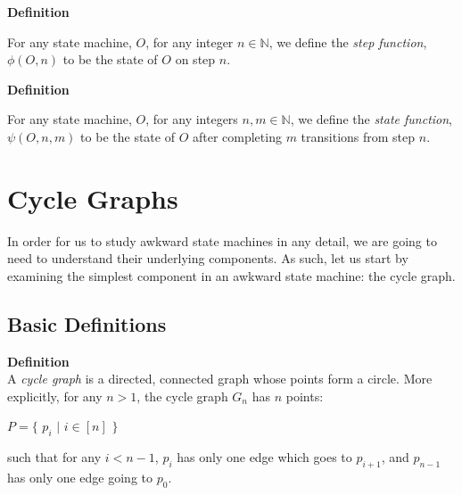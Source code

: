 \documentclass[a4paper,12pt]{article}
\begin{document}
\label{definition:state_machine}
\hypertarget{definition:state_machine}{}
\begin{tcolorbox}
\textbf{Definition}

\noindent For any state machine, $O$, for any integer $n \in \mathbb{N}$, we define the \textit{step function}, $\phi(O, n)$ to be the state of $O$ on step $n$.

\end{tcolorbox}


\label{definition:state_machine}
\hypertarget{definition:state_machine}{}
\begin{tcolorbox}
\textbf{Definition}

\noindent For any state machine, $O$, for any integers $n, m \in \mathbb{N}$, we define the \textit{state function}, $\psi(O, n, m)$ to be the state of $O$ after completing $m$ transitions from step $n$.

\end{tcolorbox}











\section{Cycle Graphs}
\label{sec:cycle_graphs}


In order for us to study awkward state machines in any detail, we are going to need to understand their underlying components. As such, let us start by examining the simplest component in an awkward state machine: the cycle graph.



\subsection{Basic Definitions}
\label{sec:cycle_graphs_basic_definitions}

\label{definition:cycle_graph}
\hypertarget{definition:cycle_graph}{}
\begin{tcolorbox}
\textbf{Definition}\\
A \textit{cycle graph} is a directed, connected graph whose points form a circle. More explicitly, for any $n > 1$, the cycle graph $G_n$ has $n$ points:

\begin{center}
$P = \{$ $p_i$ $|$ $i \in [n]$ $\}$
\end{center}
\noindent

such that for any $i < n - 1$, $p_i$ has only one edge which goes to $p_{i + 1}$, and $p_{n-1}$ has only one edge going to $p_0$.
\end{tcolorbox}
\end{document}
